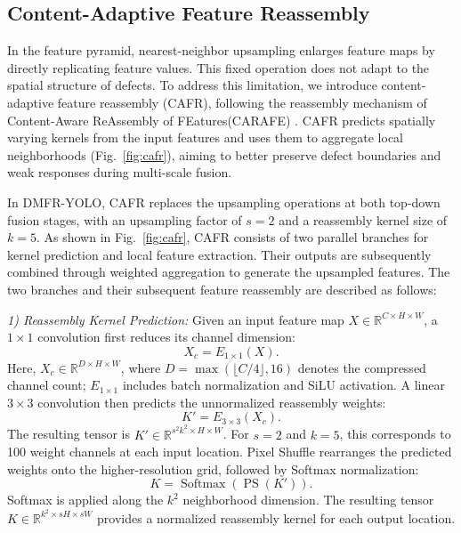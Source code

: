 \documentclass[journal]{IEEEtran}
\newcommand{\model}{DMFR-YOLO\xspace}
\begin{document}
\subsection{Content-Adaptive Feature Reassembly}
In the feature pyramid, nearest-neighbor upsampling enlarges feature maps by directly replicating feature values. This fixed operation does not adapt to the spatial structure of defects. To address this limitation, we introduce content-adaptive feature reassembly (CAFR), following the reassembly mechanism of Content-Aware ReAssembly of FEatures(CARAFE) \cite{wang2019carafe}. CAFR predicts spatially varying kernels from the input features and uses them to aggregate local neighborhoods (Fig.~\ref{fig:cafr}), aiming to better preserve defect boundaries and weak responses during multi-scale fusion.

In \model, CAFR replaces the upsampling operations at both top-down fusion stages, with an upsampling factor of $s=2$ and a reassembly kernel size of $k=5$. As shown in Fig.~\ref{fig:cafr}, CAFR consists of two parallel branches for kernel prediction and local feature extraction. Their outputs are subsequently combined through weighted aggregation to generate the upsampled features. The two branches and their subsequent feature reassembly are described as follows:

\emph{1) Reassembly Kernel Prediction:}
Given an input feature map $X\in\mathbb{R}^{C\times H\times W}$, a $1\times1$ convolution first reduces its channel dimension:
\begin{equation}
X_c=E_{1\times1}(X).
\label{eq:cafr-compression}
\end{equation}
Here, $X_c\in\mathbb{R}^{D\times H\times W}$, where $D=\max(\lfloor C/4\rfloor,16)$ denotes the compressed channel count; $E_{1\times1}$ includes batch normalization and SiLU activation. A linear $3\times3$ convolution then predicts the unnormalized reassembly weights:
\begin{equation}
K'=E_{3\times3}(X_c).
\label{eq:cafr-logits}
\end{equation}
The resulting tensor is $K'\in\mathbb{R}^{s^2k^2\times H\times W}$. For $s=2$ and $k=5$, this corresponds to 100 weight channels at each input location. Pixel Shuffle rearranges the predicted weights onto the higher-resolution grid, followed by Softmax normalization:
\begin{equation}
K=\operatorname{Softmax}\!\left(\operatorname{PS}(K')\right).
\label{eq:cafr-kernel}
\end{equation}
Softmax is applied along the $k^2$ neighborhood dimension. The resulting tensor $K\in\mathbb{R}^{k^2\times sH\times sW}$ provides a normalized reassembly kernel for each output location.
\end{document}

